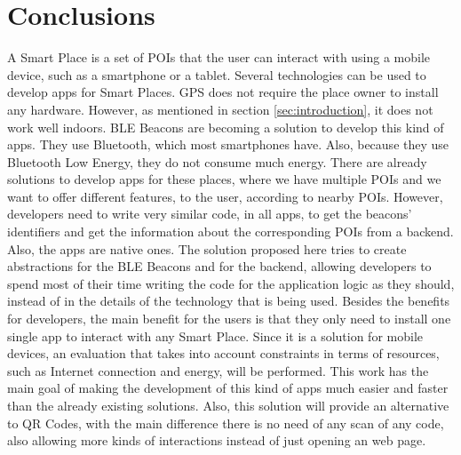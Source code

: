 
%
%

\section{Conclusions}
\label{sec:conclusions}
A Smart Place is a set of POIs that the user can interact
with using a mobile device, such as a smartphone or a tablet.
Several technologies can be used to develop apps for
Smart Places. GPS does not require the place owner to
install any hardware. However, as mentioned in 
section \ref{sec:introduction}, it does not work well
indoors. BLE Beacons are becoming a solution to
develop this kind of apps. They use Bluetooth,
which most smartphones have. Also, because they use
Bluetooth Low Energy, they do not consume much energy.
There are already solutions to develop apps for these
places, where we have multiple POIs and we want to
offer different features, to the user, according
to nearby POIs. However, developers need
to write very similar code, in all apps, to
get the beacons' identifiers and get the information
about the corresponding POIs from a backend.
Also, the apps are native ones.
The solution proposed here tries to create abstractions
for the BLE Beacons and for the backend, allowing
developers to spend most of their time writing the
code for the application logic as they should,
instead of in the details of the technology that is
being used. Besides the benefits for developers,
the main benefit for the users is that they only need
to install one single app to interact with any Smart Place.
Since it is a solution for mobile devices, an evaluation
that takes into account constraints in terms of resources,
such as Internet connection and energy, will be performed.
This work has the main goal of making the development
of this kind of apps much easier and faster than
the already existing solutions. Also, this solution
will provide an alternative
to QR Codes, with the main difference there is no need of
any scan of any code, also allowing more kinds of interactions
instead of just opening an web page. 
